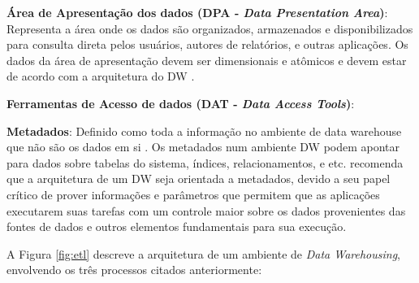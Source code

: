 \textbf{Área de Apresentação dos dados (DPA - \textit{Data Presentation Area})}:
Representa a área onde os dados são organizados, armazenados e disponibilizados para consulta direta pelos usuários, autores de relatórios, e outras aplicações. Os dados da área de apresentação devem ser dimensionais e atômicos e devem estar de acordo com a arquitetura do DW \cite{Kimball2002}.


\textbf{Ferramentas de Acesso de dados (DAT - \textit{Data Access Tools})}:

\textbf{Metadados}: Definido como toda a informação no ambiente de data warehouse que não são os dados em si \cite{Kimball2002}. Os metadados num ambiente DW podem apontar para dados sobre tabelas do sistema, índices, relacionamentos, e etc.  recomenda que a arquitetura de um DW seja orientada a metadados, devido a seu papel crítico de prover informações e parâmetros que permitem que as aplicações executarem suas tarefas com um controle maior sobre os dados provenientes das fontes de dados e outros elementos fundamentais para sua execução.




A Figura \ref{fig:etl} descreve a arquitetura de um ambiente de \textit{Data Warehousing}, envolvendo os três processos citados anteriormente:

